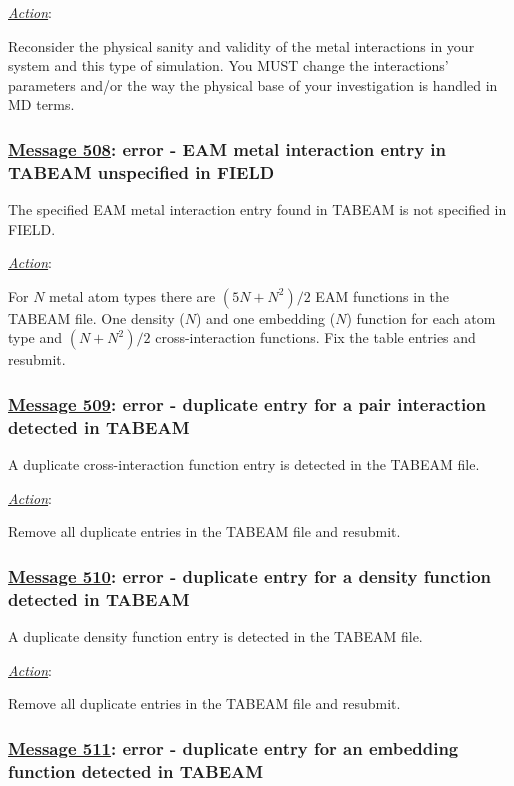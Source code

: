 \noindent \underline{\em Action}:

Reconsider the physical sanity and validity of the metal
interactions in your system and this type of simulation.
You MUST change the interactions' parameters and/or the
way the physical base of your investigation is handled in
MD terms.

\subsubsection*{\underline{Message 508}: error - EAM metal interaction entry in TABEAM unspecified in FIELD}

The specified EAM metal interaction entry found in TABEAM is not specified in FIELD.

\noindent \underline{\em Action}:

For $N$ metal atom types there are $(5N+N^{2})/2$ EAM
functions in the TABEAM file.  One density ($N$) and one
embedding ($N$) function for each atom type and $(N+N^{2})/2$
cross-interaction functions.  Fix the table entries and resubmit.

\subsubsection*{\underline{Message 509}: error - duplicate entry for a pair interaction detected in TABEAM}

A duplicate cross-interaction function entry is detected
in the TABEAM file.

\noindent \underline{\em Action}:

Remove all duplicate entries in the TABEAM file and resubmit.

\subsubsection*{\underline{Message 510}: error - duplicate entry for a density function detected in TABEAM}

A duplicate density function entry is detected
in the TABEAM file.

\noindent \underline{\em Action}:

Remove all duplicate entries in the TABEAM file and resubmit.

\subsubsection*{\underline{Message 511}: error - duplicate entry for an embedding function detected in TABEAM}

